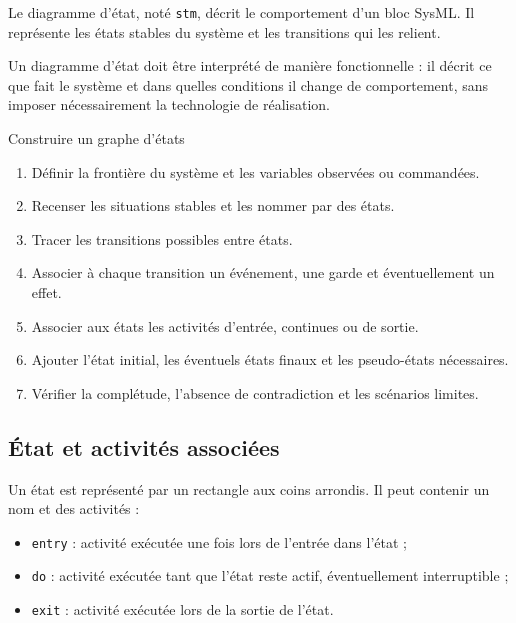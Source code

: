 Le diagramme d'état, noté \texttt{stm}, décrit le comportement d'un bloc SysML. Il représente les états stables du système et les transitions qui les relient.

\begin{center}\TLGrapheEtatsSimple\end{center}

Un diagramme d'état doit être interprété de manière fonctionnelle : il décrit ce que fait le système et dans quelles conditions il change de comportement, sans imposer nécessairement la technologie de réalisation.


\begin{TLLogicMethod}{Construire un graphe d'états}
\begin{enumerate}
  \item Définir la frontière du système et les variables observées ou commandées.
  \item Recenser les situations stables et les nommer par des états.
  \item Tracer les transitions possibles entre états.
  \item Associer à chaque transition un événement, une garde et éventuellement un effet.
  \item Associer aux états les activités d'entrée, continues ou de sortie.
  \item Ajouter l'état initial, les éventuels états finaux et les pseudo-états nécessaires.
  \item Vérifier la complétude, l'absence de contradiction et les scénarios limites.
\end{enumerate}
\end{TLLogicMethod}

\subsection{État et activités associées}

Un état est représenté par un rectangle aux coins arrondis. Il peut contenir un nom et des activités :
\begin{itemize}
  \item \texttt{entry} : activité exécutée une fois lors de l'entrée dans l'état ;
  \item \texttt{do} : activité exécutée tant que l'état reste actif, éventuellement interruptible ;
  \item \texttt{exit} : activité exécutée lors de la sortie de l'état.
\end{itemize}

